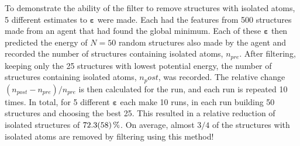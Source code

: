 To demonstrate the ability of the filter to remove structures with isolated atoms, 5 different estimates to $\bm{\varepsilon}$ were made. Each had the features from 500 structures made from an agent that had found the global minimum. Each of these $\bm{\varepsilon}$ then predicted the energy of $N=50$ random structures also made by the agent and recorded the number of structures containing isolated atoms, $n_{pre}$. After filtering, keeping only the 25 structures with lowest potential energy, the number of structures containing isolated atoms, $n_post$, was recorded. The relative change $(n_{post}-n_{pre})/n_{pre}$ is then calculated for the run, and each run is repeated 10 times. In total, for 5 different $\bm{\varepsilon}$ each make 10 runs, in each run building 50 structures and choosing the best 25. This resulted in a relative reduction of isolated structures of $\SI{72.3 \pm 5.8}{\percent}$. On average, almost $3/4$ of the structures with isolated atoms are removed by filtering using this method!




